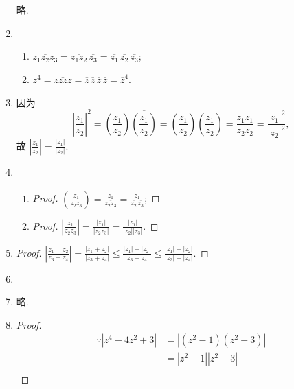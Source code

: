 \documentclass[a4paper, 11pt]{book}
\begin{document}
\begin{enumerate}
    略.
\item %
    \begin{enumerate}
        \item $\overline{z_1z_2z_3} = \overline{z_1z_2}\,\overline{z_3} = \overline{z_1}\,\overline{z_2}\,\overline{z_3}$;
        \item $\overline{z^4} = \overline{zzzz} = \overline{z}\,\overline{z}\,\overline{z}\,\overline{z} = \overline{z}^4$.
    \end{enumerate}
\item %
    因为
    \[
        \left|\frac{z_1}{z_2}\right|^2 = \left(\frac{z_1}{z_2}\right)\overline{\left(\frac{z_1}{z_2}\right)} = \left(\frac{z_1}{z_2}\right)\left(\frac{\overline{z_1}}{\overline{z_2}}\right) = \frac{z_1\overline{z_1}}{z_2\overline{z_2}} = \frac{|z_1|^2}{|z_2|^2},    
    \]
    故 $\displaystyle{\left|\frac{z_1}{z_2}\right| = \frac{|z_1|}{|z_2|}}$.
\item %
    \begin{enumerate}
        \item \begin{proof}
            $\displaystyle{
                \overline{\left(\frac{z_1}{z_2z_3}\right)} = \frac{\overline{z_1}}{\overline{z_2z_3}} = \frac{\overline{z_1}}{\overline{z_2}\,\overline{z_3}}
            }$;
        \end{proof}
        \item \begin{proof}
            $\displaystyle{
                \left|\frac{z_1}{z_2z_3}\right| = \frac{|z_1|}{|z_2z_3|} = \frac{|z_1|}{|z_2||z_3|}
            }$.
        \end{proof}
    \end{enumerate}
\item %
    \begin{proof}
        $\displaystyle{
            \left| \frac{z_1+z_2}{z_3+z_4} \right| = \frac{|z_1+z_2|}{|z_3+z_4|} \leqslant \frac{|z_1|+|z_2|}{|z_3+z_4|} \leqslant \frac{|z_1|+|z_2|}{|z_3|-|z_4|}
        }$.
    \end{proof}
\item %
\item %
    略.
\item %
    \begin{proof}
        \begin{align*}
            \because |z^4 - 4z^2 + 3| &= |(z^2 - 1)(z^2 - 3)| \\
            &= |z^2 - 1||z^2 - 3| \\

\end{align*}
\end{proof}
\end{enumerate}
\end{document}
